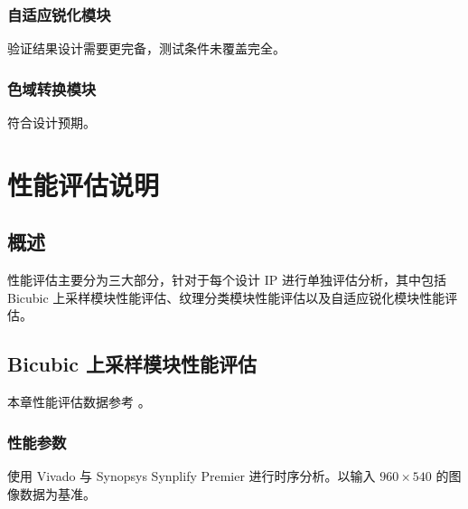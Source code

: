 \documentclass[12pt, a4paper, oneside]{ctexbook}
\begin{document}
	\subsection{自适应锐化模块}
	验证结果设计需要更完备，测试条件未覆盖完全。
	\subsection{色域转换模块}
	符合设计预期。
	
	\chapter{性能评估说明}
	\section{概述}
	性能评估主要分为三大部分，针对于每个设计 IP 进行单独评估分析，其中包括 Bicubic 上采样模块性能评估、纹理分类模块性能评估以及自适应锐化模块性能评估。
	
	\section{Bicubic 上采样模块性能评估}
	本章性能评估数据参考 \textbf{}。
	\subsection{性能参数}
	使用 Vivado 与 Synopsys Synplify Premier 进行时序分析。以输入 $960\times540$ 的图像数据为基准。
\end{document}
